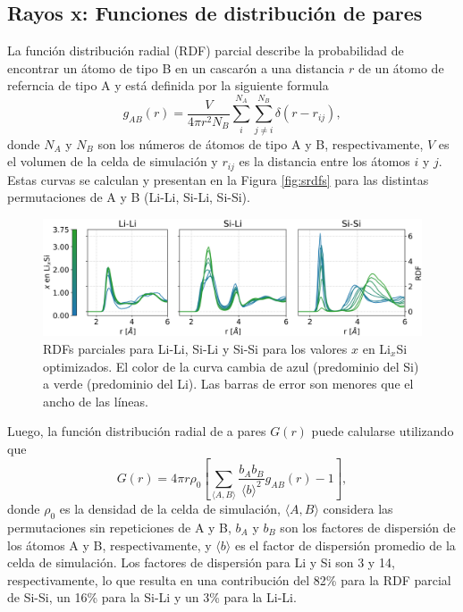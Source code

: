\subsection{Rayos x: Funciones de distribución de pares}

La función distribución radial (RDF) parcial describe la probabilidad de 
encontrar un átomo de tipo B en un cascarón a una distancia $r$ de un 
átomo de referncia de tipo A y está definida por la siguiente formula
\begin{equation}
    g_{AB}(r) = \frac{V}{4 \pi r^2 N_B} \sum_{i}^{N_A} \sum_{j\neq i}^{N_B} \delta(r - r_{ij}),
\end{equation}
donde $N_A$ y $N_B$ son los números de átomos de tipo A y B, respectivamente,
$V$ es el volumen de la celda de simulación y $r_{ij}$ es la distancia entre
los átomos $i$ y $j$. Estas curvas se calculan y presentan en la Figura 
\ref{fig:srdfs} para las distintas permutaciones de A y B (Li-Li, Si-Li, Si-Si).

\begin{figure}[h!]
    \centering
    \includegraphics[width=\textwidth]{Silicio/prediccion/resultados/xray/prdfs.png}
    \caption{RDFs parciales para Li-Li, Si-Li y Si-Si para los valores $x$ en 
    Li$_x$Si optimizados. El color de la curva cambia de azul (predominio del Si)
    a verde (predominio del Li). Las barras de error son menores que el ancho de 
    las líneas.}
    \label{fig:prdfs}
\end{figure}

Luego, la función distribución radial de a pares $G(r)$ puede calularse utilizando
que \cite{billing2019}
\begin{equation}
    G(r) = 4 \pi r \rho_0 \left[\sum_{\langle A,B \rangle} \frac{b_A b_B}{\langle b\rangle^2} g_{AB}(r) - 1\right], 
\end{equation}
donde $\rho_0$ es la densidad de la celda de simulación, $\langle A, B \rangle$
considera las permutaciones sin repeticiones de A y B, $b_A$ y $b_B$ son los 
factores de dispersión de los átomos A y B, respectivamente, y $\langle b \rangle$
es el factor de dispersión promedio de la celda de simulación. Los factores de 
dispersión para Li y Si son 3 y 14, respectivamente, lo que resulta en una 
contribución del 82\% para la RDF parcial de Si-Si, un 16\% para la Si-Li y
un 3\% para la Li-Li.

